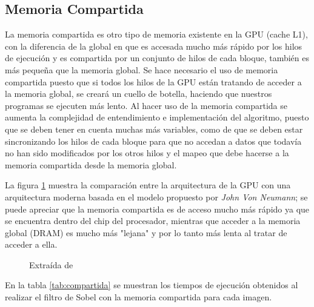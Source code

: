 \documentclass[10pt,journal,compsoc]{IEEEtran}
\begin{document}
\subsection{Memoria Compartida}

La memoria compartida es otro tipo de memoria existente en la GPU (cache L1), con la diferencia de la global en que es accesada mucho más rápido por los hilos de ejecución y es compartida por un conjunto de hilos de cada bloque, también es más pequeña que la memoria global. Se hace necesario el uso de memoria compartida puesto que si todos los hilos de la GPU están tratando de acceder a la memoria global, se creará un cuello de botella, haciendo que nuestros programas se ejecuten más lento. 
Al hacer uso de la memoria compartida se aumenta la complejidad de entendimiento e implementación del algoritmo, puesto que se deben tener en cuenta muchas más variables, como de que se deben estar sincronizando los hilos de cada bloque para que no accedan a datos que todavía no han sido modificados por los otros hilos y el mapeo que debe hacerse a la memoria compartida desde la memoria global.

La figura \ref{fig:neumann} muestra la comparación entre la arquitectura de la GPU con una arquitectura moderna basada en el modelo propuesto por \textit{John Von Neumann}; se puede apreciar que la memoria compartida es de acceso mucho más rápido ya que se encuentra dentro del chip del procesador, mientras que acceder a la memoria global (DRAM) es mucho más "lejana" y por lo tanto más lenta al tratar de acceder a ella.

\begin{figure}[ht]
\centering
    \hspace{0.1cm}
\caption{Extraída de \cite{kirk2016programming}}\label{fig:neumann}
\end{figure}

En la tabla \ref{tab:compartida} se muestran los tiempos de ejecución obtenidos al realizar el filtro de Sobel con la memoria compartida para cada imagen.
\end{document}
